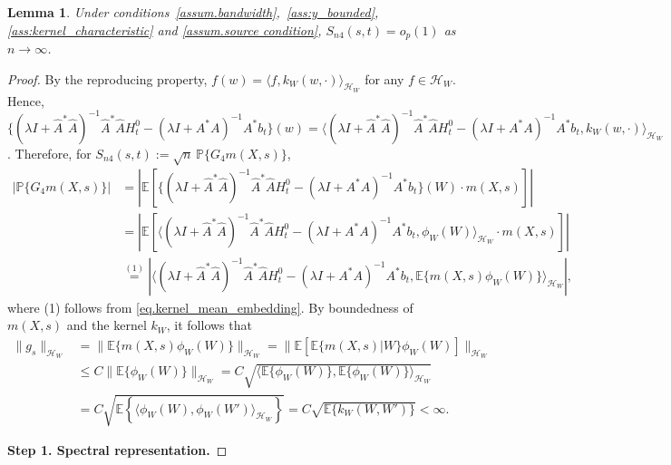 \documentclass[
  12pt]{article}
\newtheorem{lemma}{Lemma}
\def\to{\rightarrow}
\def\mP{\mathbb{P}}
\def\cH{\mathcal{H}}
\begin{document}
\begin{lemma}
\label{lemma:Tn4}
Under conditions~\ref{assum.bandwidth},~\ref{ass:y_bounded}, \ref{ass:kernel_characteristic} and \ref{assum.source condition}, $S_{n4}(s,t)=o_{p}(1)$ as $n\to\infty$.
\end{lemma}
\begin{proof}
By the reproducing property, $f(w) = \langle f,k_W(w,\cdot)\rangle_{\cH_W}$ for any $f\in \cH_W$. Hence, $\{ (\lambda I+\widehat{A}^*\widehat{A})^{-1}\widehat{A}^*\widehat{A}H^0_t-(\lambda I+A^*A)^{-1}A^*b_t \} (w)=\langle(\lambda I+\widehat{A}^*\widehat{A})^{-1}\widehat{A}^*\widehat{A}H^0_t-(\lambda I+A^*A)^{-1}A^*b_t,k_W(w,\cdot)\rangle_{\mathcal{H}_{W}}$. Therefore, for $S_{n4}(s,t):=\sqrt{n}\,\mP\{G_4m(X,s)\}$, 
\begin{align*}
	\left| \mathbb{P} \{G_4m(X,s)\} \right| &=\left| \mathbb{E} \left[ \{ (\lambda I+\widehat{A}^*\widehat{A})^{-1}\widehat{A}^*\widehat{A}H^0_t-(\lambda I+A^*A)^{-1}A^*b_t \} (W)\cdot m(X,s) \right] \right|\\
	&=\left| \mathbb{E} \left[ \langle (\lambda I+\widehat{A}^*\widehat{A})^{-1}\widehat{A}^*\widehat{A}H^0_t-(\lambda I+A^*A)^{-1}A^*b_t,\phi_W\left( W \right) \rangle_{\cH_W} \cdot m(X,s) \right] \right|\\
	&\overset{(1)}{=}\left| \langle (\lambda I+\widehat{A}^*\widehat{A})^{-1}\widehat{A}^*\widehat{A}H^0_t-(\lambda I+A^*A)^{-1}A^*b_t,\mathbb{E} \{ m(X,s)\phi_W\left( W \right) \} \rangle_{\cH_W} \right|,
\end{align*}
where (1) follows from \eqref{eq.kernel_mean_embedding}. By boundedness of $m(X,s)$ and the kernel $k_W$, it follows that 
\begin{equation}\label{eq.g_s}
    \begin{aligned}
        \| g_s\|_{\mathcal{H}_W}&=\| \mathbb{E} \{m(X,s)\phi_W(W) \} \|_{\mathcal{H}_W}=\| \mathbb{E} \left[ \mathbb{E} \{ m( X,s) |W \} \phi_W(W) \right] \|_{\mathcal{H}_W}\\
	&\le C\| \mathbb{E} \{\phi_W(W)\} \|_{\mathcal{H}_W}=C\sqrt{\langle \mathbb{E} \{\phi_W(W)\} ,\mathbb{E} \{\phi_W(W)\} \rangle_{\mathcal{H}_W}}\\
	&= C\sqrt{\mathbb{E} \left\{ \langle \phi_W(W) ,\phi_W\left( W' \right) \rangle_{\mathcal{H}_W} \right\}} =C\sqrt{\mathbb{E} \{ k_W(W,W') \}} <\infty.
    \end{aligned}
\end{equation}

\noindent\textbf{Step 1. Spectral representation.}


\end{proof}
\end{document}
